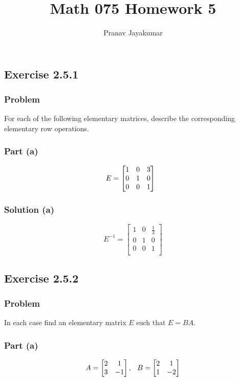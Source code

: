 \documentclass[12pt]{article}
\title{Math 075 Homework 5}
\author{Pranav Jayakumar}
\begin{document}
\maketitle
\vspace{1in}
\subsection*{Exercise 2.5.1}
\subsubsection*{Problem}
For each of the following elementary matrices,
describe the corresponding elementary row operations.\\
\subsubsection*{Part (a)}
\[
  E = \begin{bmatrix}
    1 & 0 & 3\\ 
    0 & 1 & 0\\ 
    0 & 0 & 1
  \end{bmatrix}
  \hspace{0.1in}
\]
\subsubsection*{Solution (a)}
\[
  E^{-1} = \begin{bmatrix}
    1 & 0 & \frac{1}{3}\\ 
    0 & 1 & 0\\ 
    0 & 0 & 1\\ 
  \end{bmatrix}
\]
\vspace{2in}
\subsection*{Exercise 2.5.2}
\subsubsection*{Problem}
In each case find an elementary matrix
$E$ such that $E = BA$. 
\subsubsection*{Part (a)}
\[
  A = \begin{bmatrix}
    2 & 1\\ 
    3 & -1
  \end{bmatrix},
  \hspace{0.1in}
  B = \begin{bmatrix}
    2 & 1\\ 
    1 & -2 
  \end{bmatrix}
\]
\end{document}
